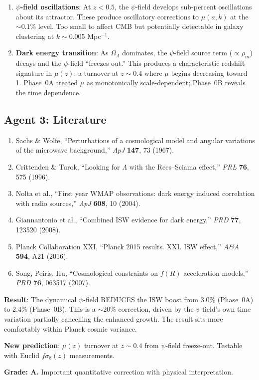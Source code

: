 \documentclass[11pt,a4paper]{article}
\begin{document}
\begin{enumerate}
\item \textbf{$\psi$-field oscillations}: At $z < 0.5$, the $\psi$-field develops sub-percent oscillations about its attractor. These produce oscillatory corrections to $\mu(a,k)$ at the $\sim 0.1\%$ level. Too small to affect CMB but potentially detectable in galaxy clustering at $k \sim 0.005$ Mpc$^{-1}$.

\item \textbf{Dark energy transition}: As $\Omega_\Lambda$ dominates, the $\psi$-field source term ($\propto \rho_m$) decays and the $\psi$-field ``freezes out.'' This produces a characteristic redshift signature in $\mu(z)$: a turnover at $z \sim 0.4$ where $\mu$ begins decreasing toward 1. Phase~0A treated $\mu$ as monotonically scale-dependent; Phase~0B reveals the time dependence.
\end{enumerate}

\subsection{Agent 3: Literature}

\begin{enumerate}
\item Sachs \& Wolfe, ``Perturbations of a cosmological model and angular variations of the microwave background,'' \textit{ApJ} \textbf{147}, 73 (1967).
\item Crittenden \& Turok, ``Looking for $\Lambda$ with the Rees--Sciama effect,'' \textit{PRL} \textbf{76}, 575 (1996).
\item Nolta et al., ``First year WMAP observations: dark energy induced correlation with radio sources,'' \textit{ApJ} \textbf{608}, 10 (2004).
\item Giannantonio et al., ``Combined ISW evidence for dark energy,'' \textit{PRD} \textbf{77}, 123520 (2008).
\item Planck Collaboration XXI, ``Planck 2015 results. XXI. ISW effect,'' \textit{A\&A} \textbf{594}, A21 (2016).
\item Song, Peiris, Hu, ``Cosmological constraints on $f(R)$ acceleration models,'' \textit{PRD} \textbf{76}, 063517 (2007).
\end{enumerate}

\begin{tcolorbox}[colback=green!5!white, colframe=green!60!black, title={Agent 3: ISW from Dynamical $\psi$-Field --- COMPUTED}]
\textbf{Result}: The dynamical $\psi$-field REDUCES the ISW boost from 3.0\% (Phase~0A) to 2.4\% (Phase~0B). This is a $\sim 20\%$ correction, driven by the $\psi$-field's own time variation partially cancelling the enhanced growth. The result sits more comfortably within Planck cosmic variance.

\textbf{New prediction}: $\mu(z)$ turnover at $z \sim 0.4$ from $\psi$-field freeze-out. Testable with Euclid $f\sigma_8(z)$ measurements.

\textbf{Grade: A.} Important quantitative correction with physical interpretation.
\end{tcolorbox}
\end{document}
